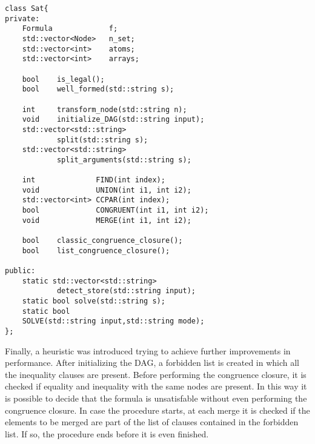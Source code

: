 \documentclass{IEEEtran}
\begin{document}
\begin{lstlisting}[style=cpp]
class Sat{
private:
	Formula 			f;
	std::vector<Node> 	n_set;
	std::vector<int> 	atoms;
	std::vector<int> 	arrays;

	bool	is_legal();
	bool 	well_formed(std::string s);
	
	int 	transform_node(std::string n);
	void 	initialize_DAG(std::string input);
	std::vector<std::string> 
			split(std::string s);
	std::vector<std::string> 
			split_arguments(std::string s);

	int 			 FIND(int index);
	void 			 UNION(int i1, int i2);
	std::vector<int> CCPAR(int index);
	bool 			 CONGRUENT(int i1, int i2);
	void 			 MERGE(int i1, int i2);

	bool 	classic_congruence_closure();
	bool 	list_congruence_closure();
	
public:
	static std::vector<std::string> 
			detect_store(std::string input);
	static bool solve(std::string s);
	static bool 
	SOLVE(std::string input,std::string mode);
};
\end{lstlisting}
Finally, a heuristic was introduced trying to achieve further improvements in performance. After initializing the DAG, a forbidden list is created in which all the inequality clauses are present. Before performing the congruence closure, it is checked if equality and inequality with the same nodes are present. In this way it is possible to decide that the formula is unsatisfable without even performing the congruence closure. In case the procedure starts, at each merge it is checked if the elements to be merged are part of the list of clauses contained in the forbidden list. If so, the procedure ends before it is even finished.
\end{document}
